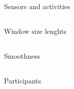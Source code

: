 \subsection{}
{

\begin{frame}{Sensors and activities}
    \begin{figure}
	\caption{} 
   \end{figure}
	
\end{frame}
}






\subsection{}
{

\begin{frame}{Window size lenghts}
    \begin{figure}
   \end{figure}
	
\end{frame}
}



\subsection{}
{

\begin{frame}{Smoothness}
    \begin{figure}
   \end{figure}
	
\end{frame}
}


\subsection{}
{

\begin{frame}{Participants}
    \begin{figure}
   \end{figure}
	
\end{frame}
}



